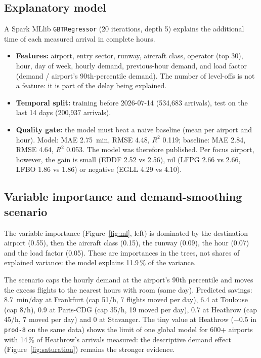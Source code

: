\documentclass[11pt,a4paper]{article}
\begin{document}
\subsection{Explanatory model}
A Spark MLlib \texttt{GBTRegressor} (20 iterations, depth 5) explains the additional time of each measured arrival in complete hours.
\begin{itemize}[noitemsep,topsep=2pt]
    \item \textbf{Features:} airport, entry sector, runway, aircraft class, operator (top 30), hour, day of week, hourly demand, previous-hour demand, and load factor (demand / airport's 90th-percentile demand). The number of level-offs is not a feature: it is part of the delay being explained.
    \item \textbf{Temporal split:} training before 2026-07-14 (534,683 arrivals), test on the last 14 days (200,937 arrivals).
    \item \textbf{Quality gate:} the model must beat a naive baseline (mean per airport and hour). Model: MAE 2.75~min, RMSE 4.48, $R^2$ 0.119; baseline: MAE 2.84, RMSE 4.64, $R^2$ 0.053. The model was therefore published. Per focus airport, however, the gain is small (EDDF 2.52 vs 2.56), nil (LFPG 2.66 vs 2.66, LFBO 1.86 vs 1.86) or negative (EGLL 4.29 vs 4.10).
\end{itemize}

\subsection{Variable importance and demand-smoothing scenario}
The variable importance (Figure~\ref{fig:ml}, left) is dominated by the destination airport (0.55), then the aircraft class (0.15), the runway (0.09), the hour (0.07) and the load factor (0.05). These are importances in the trees, not shares of explained variance: the model explains 11.9\,\% of the variance.

The scenario caps the hourly demand at the airport's 90th percentile and moves the excess flights to the nearest hours with room (same day). Predicted savings: 8.7~min/day at Frankfurt (cap 51/h, 7 flights moved per day), 6.4 at Toulouse (cap 8/h), 0.9 at Paris-CDG (cap 35/h, 19 moved per day), 0.7 at Heathrow (cap 45/h, 7 moved per day) and 0 at Stavanger. The tiny value at Heathrow ($-0.5$ in \texttt{prod-8} on the same data) shows the limit of one global model for 600+ airports with 14\,\% of Heathrow's arrivals measured: the descriptive demand effect (Figure~\ref{fig:saturation}) remains the stronger evidence.
\end{document}
